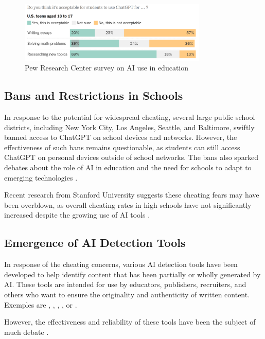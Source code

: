 \documentclass{article}
\begin{document}
\begin{figure}
    \centering
    \includegraphics[width=0.8\textwidth]{images/chatgpt_acceptable_usecases.png}
    \caption{Pew Research Center survey on AI use in education \cite{nytimes_chatbot_cheating}}
\end{figure}

\subsection{Bans and Restrictions in Schools}
In response to the potential for widespread cheating,
several large public school districts, including New York City,
Los Angeles, Seattle, and Baltimore, swiftly banned access to
ChatGPT on school devices and networks.
However, the effectiveness of such bans remains questionable,
as students can still access ChatGPT on personal devices outside
of school networks.
The bans also sparked debates about the role of AI
in education and the need for schools to adapt to emerging
technologies
\cite{missouri2023chatgpt} \cite{reddit_chatgpt_academic_purposes}.

Recent research from Stanford University suggests these cheating fears
may have been overblown, as overall cheating rates in high schools have
not significantly increased despite the growing use of AI tools
\cite{nytimes_chatbot_cheating}.

\subsection{Emergence of AI Detection Tools}
In response of the cheating concerns, various AI detection tools
have been developed to help identify content that has been partially
or wholly generated by AI.
These tools are intended for use by educators, publishers,
recruiters, and others who want to ensure the originality
and authenticity of written content.
Exemples are \cite[Originality.ai]{originality_ai},
\cite[Copyleaks]{copyleaks}, \cite[Quillbot]{quillbot},
\cite[GPTZero]{gptzero}, or \cite[Compilatio]{compilatio_ia_detecteur}.

However, the effectiveness and reliability of these tools
have been the subject of much debate
\cite{scribbr_ai_detectors} \cite{contadu_ai_detection} \cite{biomedcentral_ai_detection}.
\end{document}
